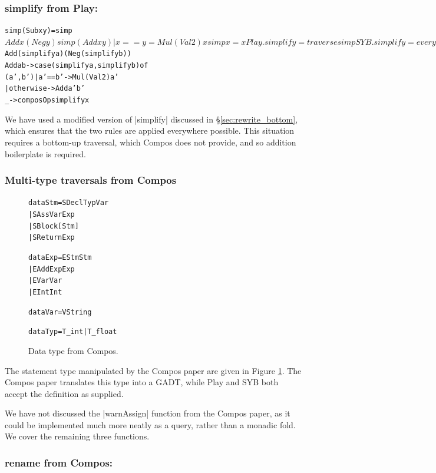\documentclass[preprint]{sigplanconf}
\newenvironment{code}{\begin{alltt}\small}{\end{alltt}}
\newcommand{\compare}[2]{\subsubsection*{\textsf{#1} from #2:}\vspace{-1ex}}
\begin{document}
\compare{simplify}{Play}

\begin{code}
simp (Sub x y)           = simp $ Add x (Neg y)
simp (Add x y) | x == y  = Mul (Val 2) x
simp x                   = x

Play.simplify = traverse simp

SYB.simplify = everywhere (mkT simp)

Comp.simplify :: Expr a -> Expr a
Comp.simplify x = case x of
    Sub  a b -> simplify $ Add (simplify a) (Neg (simplify b))
    Add  a b -> case  (simplify a, simplify b) of
                      (a',b')  | a' == b'   -> Mul (Val 2) a'
                               | otherwise  -> Add a' b'
    _ -> composOp simplify x
\end{code}

We have used a modified version of |simplify| discussed in \S\ref{sec:rewrite_bottom}, which ensures that the two rules are applied everywhere possible. This situation requires a bottom-up traversal, which Compos does not provide, and so addition boilerplate is required.

\subsubsection{Multi-type traversals from Compos}

\begin{figure}
\begin{code}
data Stm  =  SDecl    Typ Var
          |  SAss     Var Exp
          |  SBlock   [Stm]
          |  SReturn  Exp

data Exp  =  EStm  Stm
          |  EAdd  Exp Exp
          |  EVar  Var
          |  EInt  Int

data Var  =  V String

data Typ  =  T_int | T_float
\end{code}
\caption{Data type from Compos.}
\label{fig:compos}
\end{figure}

The statement type manipulated by the Compos paper are given in Figure \ref{fig:compos}. The Compos paper translates this type into a GADT, while Play and SYB both accept the definition as supplied.

We have not discussed the |warnAssign| function from the Compos paper, as it could be implemented much more neatly as a query, rather than a monadic fold. We cover the remaining three functions.

\compare{rename}{Compos}
\end{document}
